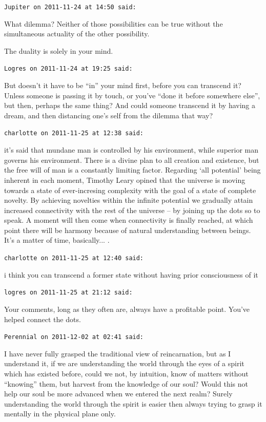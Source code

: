 \begin{footnotesize}
\begin{sffamily}
\texttt{Jupiter on 2011-11-24 at 14:50 said:}

What dilemma? Neither of those possibilities can be true without the simultaneous actuality of the other possibility.

The duality is solely in your mind.

\hfill

\texttt{Logres on 2011-11-24 at 19:25 said:}

But doesn't it have to be ``in'' your mind first, before you can transcend it? Unless someone is passing it by touch, or you've ``done it before somewhere else'', but then, perhaps the same thing? And could someone transcend it by having a dream, and then distancing one's self from the dilemma that way?

\hfill

\texttt{charlotte on 2011-11-25 at 12:38 said:}

it's said that mundane man is controlled by his environment, while superior man governs his environment. There is a divine plan to all creation and existence, but the free will of man is a constantly limiting factor. Regarding `all potential' being inherent in each moment, Timothy Leary opined that the universe is moving towards a state of ever-incresing complexity with the goal of a state of complete novelty. By achieving novelties within the infinite potential we gradually attain increased connectivity with the rest of the universe -- by joining up the dots so to speak. A moment will then come when connectivity is finally reached, at which point there will be harmony because of natural understanding between beings. It's a matter of time, basically... .

\hfill

\texttt{charlotte on 2011-11-25 at 12:40 said:}

i think you can transcend a former state without having prior consciousness of it

\hfill

\texttt{logres on 2011-11-25 at 21:12 said:}

Your comments, long as they often are, always have a profitable point. You've helped connect the dots.

\hfill

\texttt{Perennial on 2011-12-02 at 02:41 said:}

I have never fully grasped the traditional view of reincarnation, but as I understand it, if we are understanding the world through the eyes of a spirit which has existed before, could we not, by intuition, know of matters without ``knowing'' them, but harvest from the knowledge of our soul? Would this not help our soul be more advanced when we entered the next realm? Surely understanding the world through the spirit is easier then always trying to grasp it mentally in the physical plane only.


\end{sffamily}
\end{footnotesize}
